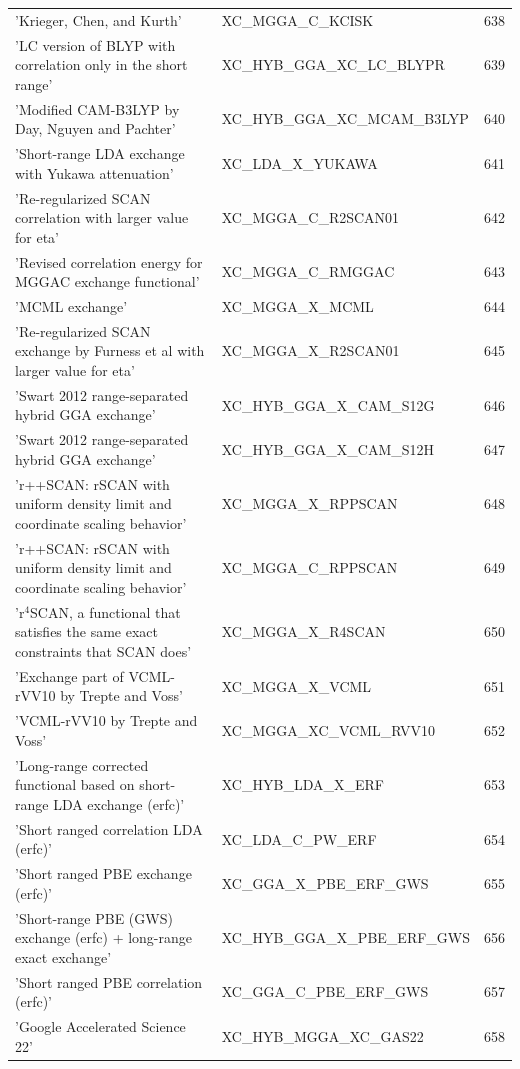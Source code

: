 \documentclass[final,12pt,makeidx,DIV=calc]{article}
\begin{document}
{{{\begin{table}[!h]
\begin{center}
\begin{tabular}{llr}
  'Krieger, Chen, and Kurth' & XC\_MGGA\_C\_KCISK  &638\\
  'LC version of BLYP with correlation only in the short range' & XC\_HYB\_GGA\_XC\_LC\_BLYPR  &639\\
  'Modified CAM-B3LYP by Day, Nguyen and Pachter' & XC\_HYB\_GGA\_XC\_MCAM\_B3LYP  &640\\
  'Short-range LDA exchange with Yukawa attenuation' & XC\_LDA\_X\_YUKAWA  &641\\
  'Re-regularized SCAN correlation with larger value for eta' & XC\_MGGA\_C\_R2SCAN01  &642\\
  'Revised correlation energy for MGGAC exchange functional' & XC\_MGGA\_C\_RMGGAC  &643\\
  'MCML exchange' & XC\_MGGA\_X\_MCML  &644\\
  'Re-regularized SCAN exchange by Furness et al with larger value for eta' & XC\_MGGA\_X\_R2SCAN01  &645\\
  'Swart 2012 range-separated hybrid GGA exchange' & XC\_HYB\_GGA\_X\_CAM\_S12G  &646\\
  'Swart 2012 range-separated hybrid GGA exchange' & XC\_HYB\_GGA\_X\_CAM\_S12H  &647\\
  'r++SCAN: rSCAN with uniform density limit and coordinate scaling behavior' & XC\_MGGA\_X\_RPPSCAN  &648\\
  'r++SCAN: rSCAN with uniform density limit and coordinate scaling behavior' & XC\_MGGA\_C\_RPPSCAN  &649\\
  'r$^{4}$SCAN, a functional that satisfies the same exact constraints that SCAN does' & XC\_MGGA\_X\_R4SCAN  &650\\
  'Exchange part of VCML-rVV10 by Trepte and Voss' & XC\_MGGA\_X\_VCML  &651\\
  'VCML-rVV10 by Trepte and Voss' & XC\_MGGA\_XC\_VCML\_RVV10  &652\\
  'Long-range corrected functional based on short-range LDA exchange (erfc)' & XC\_HYB\_LDA\_X\_ERF  &653\\
  'Short ranged correlation LDA (erfc)' & XC\_LDA\_C\_PW\_ERF  &654\\
  'Short ranged PBE exchange (erfc)' & XC\_GGA\_X\_PBE\_ERF\_GWS  &655\\
  'Short-range PBE (GWS) exchange (erfc) + long-range exact exchange' & XC\_HYB\_GGA\_X\_PBE\_ERF\_GWS  &656\\
  'Short ranged PBE correlation (erfc)' & XC\_GGA\_C\_PBE\_ERF\_GWS  &657\\
  'Google Accelerated Science 22' & XC\_HYB\_MGGA\_XC\_GAS22  &658\\

\end{tabular}
\end{center}
\end{table}}}}
\end{document}
